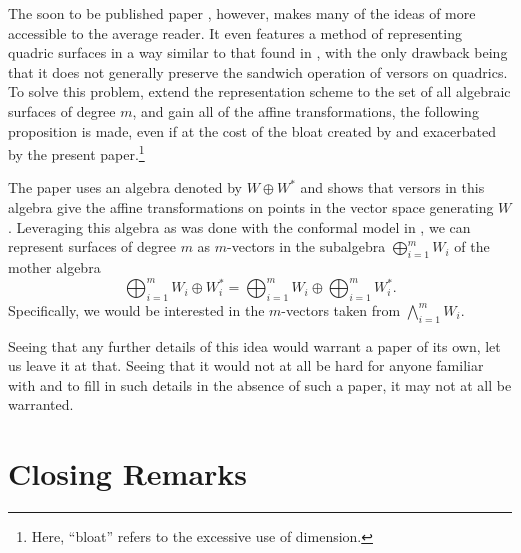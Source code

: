 \documentclass{birkjour}
\theoremstyle{definition}
\theoremstyle{remark}
\numberwithin{equation}{section}
\begin{document}
The soon to be published paper \cite{GoldmanNotYet}, however, makes many of the ideas of \cite{DoranHestenes93} more
accessible to the average reader.  It even features a method of representing quadric
surfaces in a way similar to that found in \cite{Parkin13}, with the only drawback being
that it does not generally preserve the sandwich operation of versors on quadrics.  To solve this problem,
extend the representation scheme to the set of all algebraic surfaces of degree $m$, and gain
all of the affine transformations, the following proposition is made, even if at the cost of the
bloat created by \cite{Parkin13} and exacerbated by the present paper.\footnote{Here, ``bloat'' refers
to the excessive use of dimension.}

The paper \cite{GoldmanNotYet} uses an algebra denoted by $W\oplus W^*$ and shows that versors
in this algebra give the affine transformations on points in the vector space generating $W$.
Leveraging this algebra as was done with the conformal model in \cite{Parkin13}, we can represent
surfaces of degree $m$ as $m$-vectors in the subalgebra $\bigoplus_{i=1}^m W_i$ of
the mother algebra
\begin{equation*}
\bigoplus_{i=1}^m W_i\oplus W_i^* = \bigoplus_{i=1}^m W_i\oplus\bigoplus_{i=1}^m W_i^*.
\end{equation*}
Specifically, we would be interested in the $m$-vectors taken from $\bigwedge_{i=1}^m W_i$.

Seeing that any further
details of this idea would warrant a paper of its own, let us leave it at that.  Seeing that it would not at all be hard for
anyone familiar with \cite{Parkin13} and \cite{GoldmanNotYet} to fill in such details in the absence of such a paper,
it may not at all be warranted.

\section{Closing Remarks}
\end{document}
